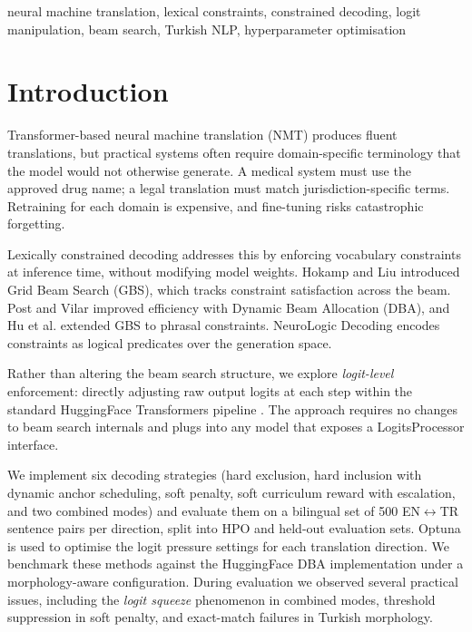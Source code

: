 \documentclass{tlp}
\begin{document}
\begin{keywords}
neural machine translation, lexical constraints, constrained decoding, logit manipulation, beam search, Turkish NLP, hyperparameter optimisation
\end{keywords}

\section{Introduction}

Transformer-based neural machine translation (NMT) \citep{vaswani2017attention}
produces fluent translations, but practical systems often require domain-specific
terminology that the model would not otherwise generate. A medical system must use
the approved drug name; a legal translation must match jurisdiction-specific terms.
Retraining for each domain is expensive, and fine-tuning risks catastrophic
forgetting.

Lexically constrained decoding addresses this by enforcing vocabulary constraints at
inference time, without modifying model weights. Hokamp and Liu
\citeyearpar{hokamp2017lexically} introduced Grid Beam Search (GBS), which tracks
constraint satisfaction across the beam. Post and Vilar \citeyearpar{post2018fast}
improved efficiency with Dynamic Beam Allocation (DBA), and Hu et al.
\citeyearpar{hu2019improved} extended GBS to phrasal constraints. NeuroLogic
Decoding \citep{lu2021neurologic} encodes constraints as logical predicates over
the generation space.

Rather than altering the beam search structure, we explore \emph{logit-level}
enforcement: directly adjusting raw output logits at each step within the standard
HuggingFace Transformers pipeline \citep{wolf2020transformers}. The approach
requires no changes to beam search internals and plugs into any model that exposes
a LogitsProcessor interface.

We implement six decoding strategies (hard exclusion, hard inclusion with dynamic
anchor scheduling, soft penalty, soft curriculum reward with escalation, and two
combined modes) and evaluate them on a bilingual set of 500 EN$\leftrightarrow$TR
sentence pairs per direction, split into HPO and held-out evaluation sets. Optuna
\citep{akiba2019optuna} is used to optimise the logit pressure settings for each
translation direction. We benchmark these methods against the HuggingFace DBA
implementation under a morphology-aware configuration. During evaluation we observed
several practical issues, including the \emph{logit squeeze} phenomenon in combined
modes, threshold suppression in soft penalty, and exact-match failures in Turkish
morphology.
\end{document}
